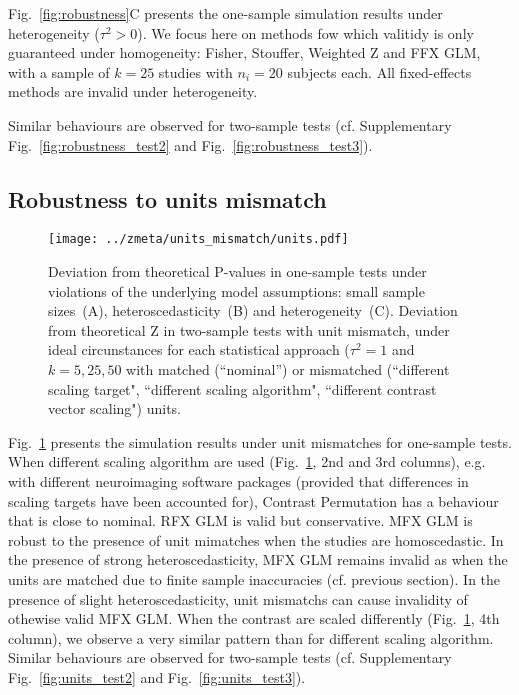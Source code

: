 \documentclass[preprint]{elsarticle}
\newcommand{\nStudies}{k}
\newcommand{\varBetween}{\tau^2}
\newcommand{\nSubjects}[1][i]{n_{#1}}
\begin{document}
Fig.~\ref{fig:robustness}C presents the one-sample simulation results under heterogeneity ($\varBetween>0$). We focus here on methods fow which valitidy is only guaranteed under homogeneity: Fisher, Stouffer, Weighted Z and FFX GLM, with a sample of $\nStudies=25$ studies with $\nSubjects=20$ subjects each. All fixed-effects methods are invalid under heterogeneity.

Similar behaviours are observed for two-sample tests (cf. Supplementary Fig.~\ref{fig:robustness_test2} and Fig.~\ref{fig:robustness_test3}).

\subsection{Robustness to units mismatch}

\begin{figure}[h]
	\centering
 	\texttt{[image: ../zmeta/units\_mismatch/units.pdf]}
	\caption{Deviation from theoretical P-values in one-sample tests under violations of the underlying model assumptions: small sample sizes~(A), heteroscedasticity~(B) and heterogeneity~(C). Deviation from theoretical Z in two-sample tests with unit mismatch, under ideal circunstances for each statistical approach ($\varBetween=1$ and $\nStudies = 5, 25, 50$ with matched (``nominal'') or mismatched (``different scaling target", ``different scaling algorithm", ``different contrast vector scaling") units.}
	\label{fig:units}
\end{figure}

Fig.~\ref{fig:units} presents the simulation results under unit mismatches for one-sample tests. When different scaling algorithm are used (Fig.~\ref{fig:units}, 2nd and 3rd columns), e.g. with different neuroimaging software packages (provided that differences in scaling targets have been accounted for), Contrast Permutation has a behaviour that is close to nominal. RFX GLM is valid but conservative. MFX GLM is robust to the presence of unit mimatches when the studies are homoscedastic. In the presence of strong heteroscedasticity, MFX GLM remains invalid as when the units are matched due to finite sample inaccuracies (cf. previous section). In the presence of slight heteroscedasticity, unit mismatchs can cause invalidity of othewise valid MFX GLM. When the contrast are scaled differently (Fig.~\ref{fig:units}, 4th column), we observe a very similar pattern than for different scaling algorithm. Similar behaviours are observed for two-sample tests (cf. Supplementary Fig.~\ref{fig:units_test2} and Fig.~\ref{fig:units_test3}).
\end{document}

